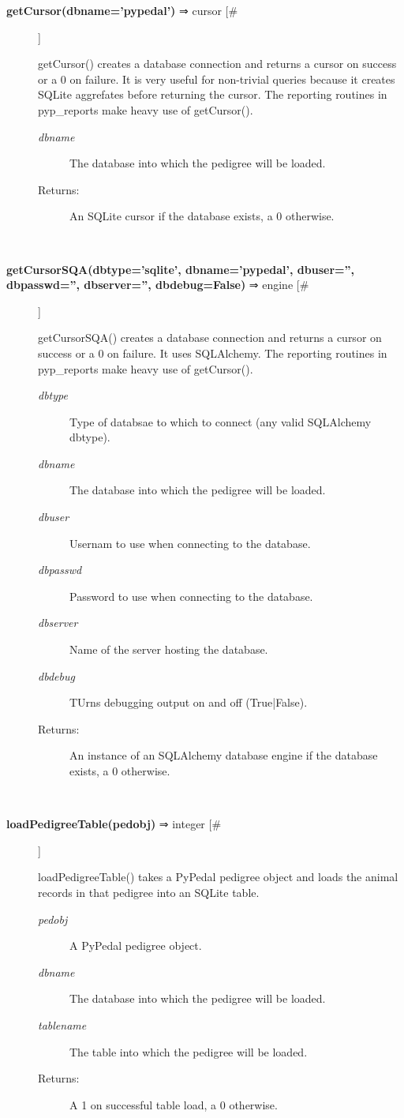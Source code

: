 \documentclass{article}
\begin{document}
\begin{description}
\item[\textbf{getCursor(dbname='pypedal')} ⇒ cursor [\#]
]
\par getCursor() creates a database connection and returns a
cursor on success or a 0 on failure.  It is very useful for
non-trivial queries because it creates SQLite aggrefates
before returning the cursor.  The reporting routines in pyp\_reports
make heavy use of getCursor().
\begin{description}
\item[\textit{dbname}
]
The database into which the pedigree will be loaded.
\item[Returns:
]
An SQLite cursor if the database exists, a 0 otherwise.
\end{description}\\

\item[\textbf{getCursorSQA(dbtype='sqlite', dbname='pypedal', dbuser='', dbpasswd='', dbserver='', dbdebug=False)} ⇒ engine [\#]
]
\par getCursorSQA() creates a database connection and returns a
cursor on success or a 0 on failure. It uses SQLAlchemy.
The reporting routines in pyp\_reports make heavy use of
getCursor().
\begin{description}
\item[\textit{dbtype}
]
Type of databsae to which to connect (any valid SQLAlchemy dbtype).
\item[\textit{dbname}
]
The database into which the pedigree will be loaded.
\item[\textit{dbuser}
]
Usernam to use when connecting to the database.
\item[\textit{dbpasswd}
]
Password to use when connecting to the database.
\item[\textit{dbserver}
]
Name of the server hosting the database.
\item[\textit{dbdebug}
]
TUrns debugging output on and off (True|False).
\item[Returns:
]
An instance of an SQLAlchemy database engine if the database exists, a 0 otherwise.
\end{description}\\

\item[\textbf{loadPedigreeTable(pedobj)} ⇒ integer [\#]
]
\par loadPedigreeTable() takes a PyPedal pedigree object and loads
the animal records in that pedigree into an SQLite table.
\begin{description}
\item[\textit{pedobj}
]
A PyPedal pedigree object.
\item[\textit{dbname}
]
The database into which the pedigree will be loaded.
\item[\textit{tablename}
]
The table into which the pedigree will be loaded.
\item[Returns:
]
A 1 on successful table load, a 0 otherwise.
\end{description}\\


\end{description}
\end{document}

